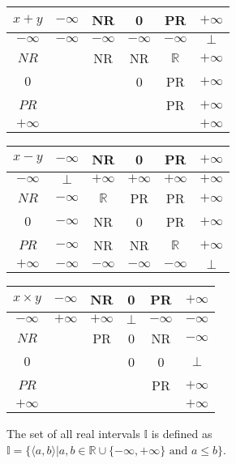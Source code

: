 \begin{tabular}{c||*{5}{c|}}
$x + y$
&$-\infty$&NR&0
&PR&$+\infty$\\\hline
$-\infty$ &$-\infty$&$-\infty$&$-\infty$&$-\infty$&$\bot$\\\hline
$NR$ &&NR&NR&$\mathbb{R}$&$+\infty$\\\hline
$0$&&&0&PR&$+\infty$\\\hline
$PR$ &&&&PR&$+\infty$\\\hline
$+\infty$ &&&&&$+\infty$\\\hline
\end{tabular}
\quad
\begin{tabular}{c||*{5}{c|}}
$x - y$
&$-\infty$&NR&0
&PR&$+\infty$\\\hline
$-\infty$ &$\bot$&$+\infty$&$+\infty$&$+\infty$&$+\infty$\\\hline
$NR$ &$-\infty$&$\mathbb{R}$&PR&PR&$+\infty$\\\hline
$0$&$-\infty$&NR&0&PR&$+\infty$\\\hline
$PR$ &$-\infty$&NR&NR&$\mathbb{R}$&$+\infty$\\\hline
$+\infty$ &$-\infty$&$-\infty$&$-\infty$&$-\infty$&$\bot$\\\hline
\end{tabular}
\newline
\vspace*{1 cm}
\newline
\begin{tabular}{c||*{5}{c|}}
$x \times y$
&$-\infty$&NR&0
&PR&$+\infty$\\\hline
$-\infty$ &$+\infty$&$+\infty$&$\bot$&$-\infty$&$-\infty$\\\hline
$NR$ &&PR&0&NR&$-\infty$\\\hline
$0$&&&0&0&$\bot$\\\hline
$PR$ &&&&PR&$+\infty$\\\hline
$+\infty$ &&&&&$+\infty$\\\hline
\end{tabular}

\begin{definition} \label{def:real_intervals}
The set of all real intervals $\mathbb{I}$ is defined as $\mathbb{I} = \{\langle a, b \rangle | a, b \in \mathbb{R} \cup \{-\infty, +\infty\} \text{ and } a \le b \}$.
\end{definition}

